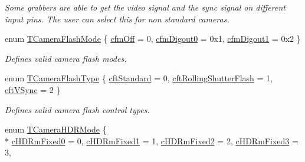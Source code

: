 \begin{DoxyCompactItemize}
\begin{DoxyCompactList}\small\item\em Some grabbers are able to get the video signal and the sync signal on different input pins. The user can select this for non standard cameras. \end{DoxyCompactList}\item 
enum \hyperlink{group___device_specific_interface_ga7013a9eafe8e5d0e6c9977dacf8871f7}{T\+Camera\+Flash\+Mode} \{ \hyperlink{group___device_specific_interface_gga7013a9eafe8e5d0e6c9977dacf8871f7a9eba3acccaaa225d0b3672e0d3eefdb7}{cfm\+Off} = 0, 
\hyperlink{group___device_specific_interface_gga7013a9eafe8e5d0e6c9977dacf8871f7a24c608122cfe61a77f3779defea2d1b7}{cfm\+Digout0} = 0x1, 
\hyperlink{group___device_specific_interface_gga7013a9eafe8e5d0e6c9977dacf8871f7a9199f8467576696ca21a4ab064861803}{cfm\+Digout1} = 0x2
 \}
\begin{DoxyCompactList}\small\item\em Defines valid camera flash modes. \end{DoxyCompactList}\item 
enum \hyperlink{group___device_specific_interface_gafecb78a5d28cf072b169a8214d6b9a34}{T\+Camera\+Flash\+Type} \{ \hyperlink{group___device_specific_interface_ggafecb78a5d28cf072b169a8214d6b9a34aa063a13ebe3accfef45082ce2b45c1ff}{cft\+Standard} = 0, 
\hyperlink{group___device_specific_interface_ggafecb78a5d28cf072b169a8214d6b9a34a46f4a6be7448991ef2365fdbb0a0462f}{cft\+Rolling\+Shutter\+Flash} = 1, 
\hyperlink{group___device_specific_interface_ggafecb78a5d28cf072b169a8214d6b9a34a5eee3bb4481284f6d9db71512ae5508a}{cft\+V\+Sync} = 2
 \}
\begin{DoxyCompactList}\small\item\em Defines valid camera flash control types. \end{DoxyCompactList}\item 
enum \hyperlink{group___device_specific_interface_ga4d3429fb463a4c07dc7a32d43c04f5d4}{T\+Camera\+H\+D\+R\+Mode} \{ \\*
\hyperlink{group___device_specific_interface_gga4d3429fb463a4c07dc7a32d43c04f5d4a4f612dbb3a812bfdf42f4d423b0a741b}{c\+H\+D\+Rm\+Fixed0} = 0, 
\hyperlink{group___device_specific_interface_gga4d3429fb463a4c07dc7a32d43c04f5d4a423fda94d0aaf297f538460f04012eb9}{c\+H\+D\+Rm\+Fixed1} = 1, 
\hyperlink{group___device_specific_interface_gga4d3429fb463a4c07dc7a32d43c04f5d4a7ef4ed052b38aa0d660424b6b3e9ec04}{c\+H\+D\+Rm\+Fixed2} = 2, 
\hyperlink{group___device_specific_interface_gga4d3429fb463a4c07dc7a32d43c04f5d4a8729b1a832e1aeea9e6c96b73090d234}{c\+H\+D\+Rm\+Fixed3} = 3, 

\end{DoxyCompactItemize}
